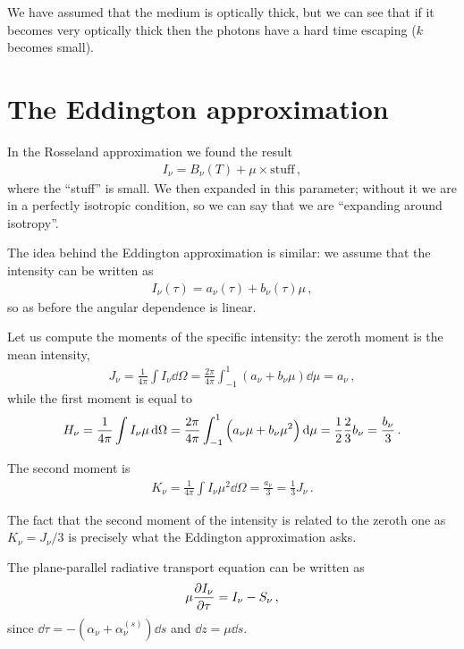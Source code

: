 \documentclass[main.tex]{subfiles}
\begin{document}
We have assumed that the medium is optically thick, but we can see that if it becomes very optically thick then the photons have a hard time escaping (\(k\) becomes small). 

\section{The Eddington approximation}

In the Rosseland approximation we found the result 
%
\begin{align}
I_\nu = B_\nu (T) + \mu \times \text{stuff} 
\,,
\end{align}
%
where the ``stuff'' is small. We then expanded in this parameter; without it we are in a perfectly isotropic condition, so we can say that we are ``expanding around isotropy''. 

The idea behind the Eddington approximation is similar: we assume that the intensity can be written as 
%
\begin{align}
I_\nu (\tau ) = a_\nu (\tau ) + b_\nu (\tau ) \mu  
\,,
\end{align}
%
so as before the angular dependence is linear. 

Let us compute the moments of the specific intensity: the zeroth moment is the mean intensity, 
%
\begin{align}
J_\nu = \frac{1}{4 \pi } \int I_\nu \dd{\Omega } 
= \frac{2 \pi }{4 \pi } \int_{-1}^{1} (a_\nu + b_\nu \mu) \dd{\mu }
= a_\nu 
\,,
\end{align}
%
while the first moment is equal to 
%
\begin{align}
H_\nu = \frac{1}{4 \pi } \int I_\nu \mu \dd{\Omega }
= \frac{2 \pi }{4 \pi } \int_{-1}^{1} \qty(a_\nu \mu + b_\nu \mu^2) \dd{\mu } = \frac{1}{2} \frac{2}{3} b_\nu = \frac{b_\nu }{3}
\,.
\end{align}

The second moment is
%
\begin{align}
K_\nu = \frac{1}{4 \pi } \int I_\nu \mu^2 \dd{\Omega } = \frac{a_\nu }{3}
= \frac{1}{3} J_\nu 
\,.
\end{align}

The fact that the second moment of the intensity  is related to the zeroth one as \(K_\nu = J_\nu / 3\) is precisely what the Eddington approximation asks. 

The plane-parallel radiative transport equation can be written as  
%
\begin{align}
\mu \pdv{I_\nu }{\tau } = I_\nu - S_\nu 
\,,
\end{align}
%
since \(\dd{\tau } = -(\alpha_{\nu } + \alpha_{\nu }^{(s)}) \dd{s}\) and \(\dd{z} = \mu \dd{s}\). 
\end{document}
